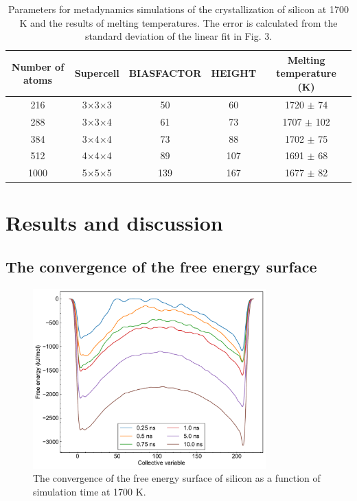 \documentclass{article}
\begin{document}
\begin{table}[h]
    \centering
    \caption{Parameters for metadynamics simulations of the crystallization of silicon at 1700 K and the results of melting temperatures. The error is calculated from the standard deviation of the linear fit in Fig. 3.}
    \begin{tabular}{ccccc}
    \toprule
    Number of atoms & Supercell & BIASFACTOR & HEIGHT & Melting temperature (K) \\ \midrule
    216             & 3×3×3  & 50         & 60      & 1720 $\pm$ 74\\
    288             & 3×3×4  & 61         & 73      & 1707 $\pm$ 102\\
    384             & 3×4×4  & 73         & 88      & 1702 $\pm$ 75\\
    512             & 4×4×4  & 89         & 107     & 1691 $\pm$ 68\\
    1000            & 5×5×5  & 139        & 167     & 1677 $\pm$ 82\\ \bottomrule
    \end{tabular}
    \end{table}

\section{Results and discussion}

\subsection{The convergence of the free energy surface}

\begin{figure}[h]
    \centering
    \includegraphics[width=0.8\textwidth]{./plot/conv.pdf}
    \caption{The convergence of the free energy surface of silicon as a function of simulation time at 1700 K.}
\end{figure}
\end{document}
